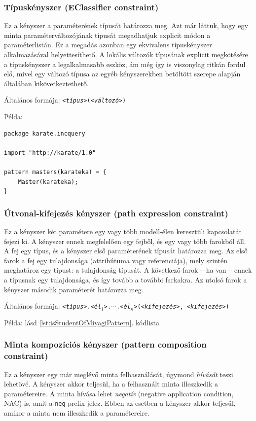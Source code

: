\subsubsection{Típuskényszer (EClassifier constraint)}
Ez a kényszer a paraméterének típusát határozza meg.
Azt már láttuk, hogy egy minta paraméterváltozójának típusát megadhatjuk explicit módon a paraméterlistán.
Ez a megadás azonban egy ekvivalens típuskényszer alkalmazásával helyettesíthető.
A lokális változók típusának explicit megkötésére a típuskényszer a legalkalmasabb eszköz, ám még így is viszonylag ritkán fordul elő, mivel egy változó típusa az egyéb kényszerekben betöltött szerepe alapján általában kikövetkeztethető.

\noindent Általános formája: \texttt{\textit{<típus>}(\textit{<változó>})}

\noindent Példa:
\begin{lstlisting}
package karate.incquery

import "http://karate/1.0"

pattern masters(karateka) = {
    Master(karateka);
}
\end{lstlisting}

\subsubsection{Útvonal-kifejezés kényszer (path expression constraint)}
Ez a kényszer két paramétere egy vagy több modell-élen keresztüli kapcsolatát fejezi ki.
A kényszer ennek megfelelően egy fejből, és egy vagy több farokból áll.
A fej egy típus, és a kényszer első paraméterének típusát határozza meg.
Az első farok a fej egy tulajdonsága (attribútuma vagy referenciája), mely szintén meghatároz egy típust: a tulajdonság típusát.
A következő farok -- ha van -- ennek a típusnak egy tulajdonsága, és így tovább a további farkakra.
Az utolsó farok a kényszer második paraméterét határozza meg.

\noindent Általános formája: \texttt{\textit{<típus>}.\textit{<él$_1$>}.$\cdots$.\textit{<él$_n$>}(\textit{<kifejezés>}, \textit{<kifejezés>})}

\noindent Példa: lásd \ref{lst:isStudentOfMiyagiPattern}. kódlista

\subsubsection{Minta kompozíciós kényszer (pattern composition constraint)}
Ez a kényszer egy már meglévő minta felhasználását, úgymond \emph{hívását} teszi lehetővé.
A kényszer akkor teljesül, ha a felhasznált minta illeszkedik a paramétereire.
A minta hívása lehet \emph{negatív} (negative application condition, \gls{NAC}) is, amit a \texttt{neg} prefix jelez.
Ebben az esetben a kényszer akkor teljesül, amikor a minta nem illeszkedik a paramétereire.

